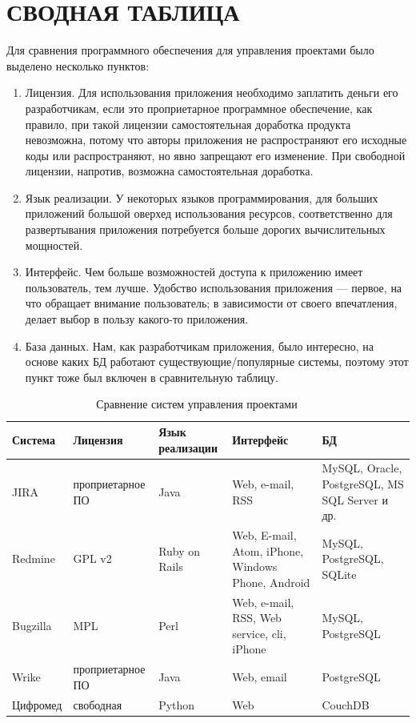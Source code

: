 \documentclass[14pt, a4paper]{extreport}
\begin{document}
\section{\MakeTextUppercase{Сводная таблица}}
Для сравнения программного обеспечения для управления проектами было выделено
несколько пунктов:
\begin{enumerate}
\item Лицензия. Для использования приложения необходимо заплатить деньги
  его разработчикам, если это проприетарное программное обеспечение, как правило,
  при такой лицензии самостоятельная доработка продукта невозможна, потому
  что авторы приложения не распространяют его исходные коды или распространяют, но
  явно запрещают его изменение. При свободной лицензии,
  напротив, возможна самостоятельная доработка.
\item Язык реализации. У некоторых языков программирования, для больших приложений
  большой оверхед использования ресурсов, соответственно для развертывания приложения
  потребуется больше дорогих вычислительных мощностей.
\item Интерфейс. Чем больше возможностей доступа к приложению имеет пользователь, тем лучше.
  Удобство использования приложения --- первое, на что обращает внимание пользователь;
  в зависимости от своего впечатления, делает выбор в пользу какого-то приложения.
\item База данных. Нам, как разработчикам приложения, было интересно, на основе каких БД
  работают существующие/популярные системы, поэтому этот пункт тоже был включен в сравнительную таблицу.
\end{enumerate}

\begin{table}[!htb]
  \caption{Сравнение систем управления проектами~\cite{jira_off}~\cite{redmine_off}~\cite{bugzilla_off}~\cite{wrike_off}}
  \label{tab:cmp_pm}
  \begin{center}
    \begin{tabularx}{\textwidth}{|l|X|X|X|X|}
      \hline
      Система & Лицензия & Язык реализации & Интерфейс & БД \\
      \hline
      JIRA & проприетарное ПО & Java & Web, e-mail, RSS & MySQL, Oracle, PostgreSQL, MS SQL Server и др. \\
      \hline
      Redmine & GPL v2 & Ruby on Rails & Web, E-mail, Atom, iPhone, Windows Phone, Android & MySQL, PostgreSQL, SQLite \\
      \hline
      Bugzilla & MPL & Perl & Web, e-mail, RSS, Web service, cli, iPhone & MySQL, PostgreSQL \\
      \hline
      Wrike & проприетарное ПО & Java & Web, email & PostgreSQL \\
      \hline
      Цифромед & свободная & Python & Web & CouchDB \\
      \hline
    \end{tabularx}
  \end{center}
\end{table}
\end{document}
